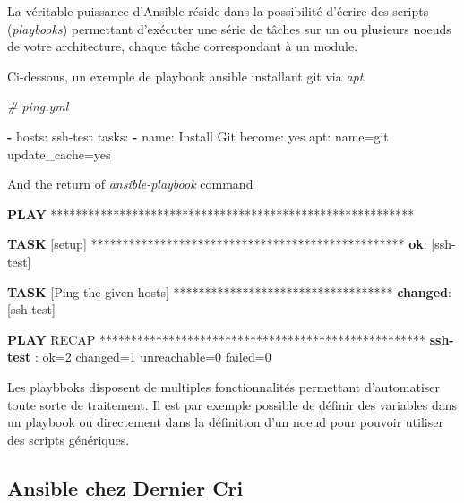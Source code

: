 \documentclass[12pt,a4paper]{article}
\newenvironment{Shaded}{}{}
\newcommand{\KeywordTok}[1]{\textcolor[rgb]{0.00,0.44,0.13}{\textbf{{#1}}}}
\newcommand{\CommentTok}[1]{\textcolor[rgb]{0.38,0.63,0.69}{\textit{{#1}}}}
\newcommand{\FunctionTok}[1]{\textcolor[rgb]{0.02,0.16,0.49}{{#1}}}
\newcommand{\NormalTok}[1]{{#1}}
\begin{document}
  La véritable puissance d'Ansible réside dans la possibilité d'écrire des
  scripts (\emph{playbooks}) permettant d'exécuter une série de tâches sur
  un ou plusieurs noeuds de votre architecture, chaque tâche correspondant
  à un module.

  \bigskip

  Ci-dessous, un exemple de playbook ansible installant git via
  \emph{apt}.

  \begin{Shaded}
  \begin{Highlighting}[]
  \CommentTok{# ping.yml}

  \KeywordTok{-} \FunctionTok{hosts:} \NormalTok{ssh-test}
    \FunctionTok{tasks:}
      \KeywordTok{-} \FunctionTok{name:} \NormalTok{Install Git}
        \FunctionTok{become:} \NormalTok{yes}
        \FunctionTok{apt:} \NormalTok{name=git update_cache=yes}
  \end{Highlighting}
  \end{Shaded}

  And the return of \emph{ansible-playbook} command

  \bigskip

  \begin{Shaded}
  \begin{Highlighting}[]
  \KeywordTok{PLAY} \NormalTok{**********************************************************}

  \KeywordTok{TASK} \NormalTok{[setup] **************************************************}
  \KeywordTok{ok}\NormalTok{: [ssh-test]}

  \KeywordTok{TASK} \NormalTok{[Ping the given hosts] ***********************************}
  \KeywordTok{changed}\NormalTok{: [ssh-test]}

  \KeywordTok{PLAY} \NormalTok{RECAP ****************************************************}
  \KeywordTok{ssh-test}       \NormalTok{: ok=2    changed=1    unreachable=0    failed=0   }
  \end{Highlighting}
  \end{Shaded}

  \bigskip

  Les playbboks disposent de multiples fonctionnalités permettant
  d'automatiser toute sorte de traitement. Il est par exemple possible de
  définir des variables dans un playbook ou directement dans la définition
  d'un noeud pour pouvoir utiliser des scripts génériques.

  \newpage

  \subsection{Ansible chez Dernier Cri}\label{ansible-chez-dernier-cri}
\end{document}

